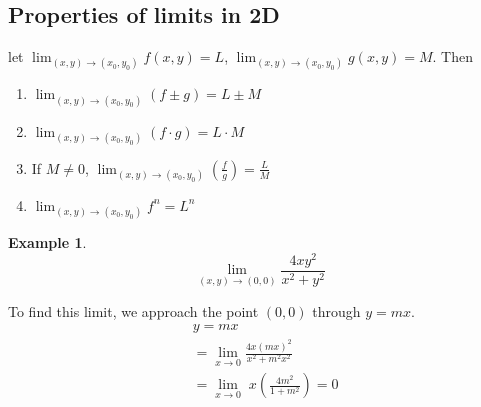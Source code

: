 \documentclass[12pt]{article}
\theoremstyle{definition}
\newtheorem*{example}{Example}
\theoremstyle{definition}
\begin{document}
\subsection{Properties of limits in 2D}

let $ \lim_{(x, y) \to (x_0, y_0)} f(x, y) = L$, $ \lim_{(x, y) \to (x_0, y_0)} g(x, y) = M$. Then

\begin{enumerate}
	\item $ \lim_{(x, y) \to (x_0, y_0)}  (f \pm g) = L \pm M$
	\item $ \lim_{(x, y) \to (x_0, y_0)}  (f \cdot g) = L \cdot M$
	\item If $M\neq0$, $ \lim_{(x, y) \to (x_0, y_0)}  \left( \frac{f}{g} \right) = \frac{L}{M}$
	\item $ \lim_{(x, y) \to (x_0, y_0)} f^n = L^n$
\end{enumerate}

\begin{example}
	\begin{equation*}
		\lim_{(x, y) \to (0, 0)} \frac{4xy^2}{x^2 + y^2}
	\end{equation*}

	To find this limit, we approach the point $(0, 0)$ through $y = mx$. 
	\begin{align*}
		&y = mx \\
		&= \lim_{x \to 0} \frac{4x \left( mx \right)^2}{x^2 + m^2x^2} \\ 
		&= \lim_{x \to 0}\;x \left( \frac{4m^2}{1 + m^2} \right) = 0
	\end{align*}

\end{example}
\end{document}
